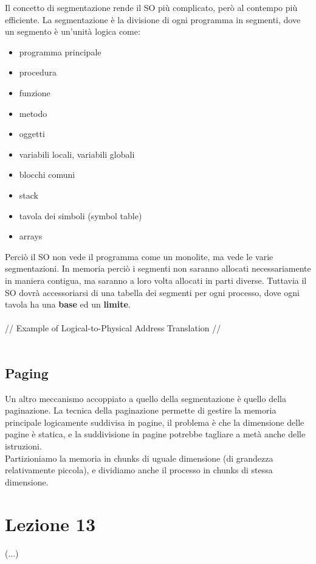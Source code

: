 \documentclass[12pt, a4paper]{article}
\begin{document}
	Il concetto di segmentazione rende il SO più complicato, però al contempo più efficiente. La segmentazione è la divisione di ogni programma in segmenti, dove un segmento è un'unità logica come:
	\begin{itemize}
		\item programma principale
		\item procedura
		\item funzione
		\item metodo
		\item oggetti
		\item variabili locali, variabili globali
		\item blocchi comuni
		\item stack
		\item tavola dei simboli (symbol table)
		\item arrays
	\end{itemize}
	Perciò il SO non vede il programma come un monolite, ma vede le varie segmentazioni. In memoria perciò i segmenti non saranno allocati necessariamente in maniera contigua, ma saranno a loro volta allocati in parti diverse. Tuttavia il SO dovrà accessoriarsi di una tabella dei segmenti per ogni processo, dove ogni tavola ha una \textbf{base} ed un \textbf{limite}. \\\\
	// Example of Logical-to-Physical Address Translation // \\ \\
	
	
	\subsection*{Paging}
	
	Un altro meccanismo accoppiato a quello della segmentazione è quello della paginazione. La tecnica della paginazione permette di gestire la memoria principale logicamente suddivisa in pagine, il problema è che la dimensione delle pagine è statica, e la suddivisione in pagine potrebbe tagliare a metà anche delle istruzioni. \\
	Partizioniamo la memoria in chunks di uguale dimensione (di grandezza relativamente piccola), e dividiamo anche il processo in chunks di stessa dimensione.
	
	
	
	\section*{Lezione 13}
	(...)
	
\end{document}
